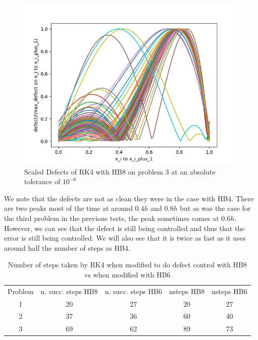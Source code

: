 \documentclass{article}
\begin{document}
\begin{figure}[H]
\centering
\includegraphics[width=0.7\linewidth]{./figures/rk4_with_hb8_p3_scaled_defects}
\caption{Scaled Defects of RK4 with HB8 on problem 3 at an absolute tolerance of $10^{-6}$}
\label{fig:rk4_with_hb8_p3_scaled_defects}
\end{figure}

We note that the defects are not as clean they were in the case with HB4. There are two peaks most of the time at around $0.4h$ and $0.8h$ but as was the case for the third problem in the previous tests, the peak sometimes comes at $0.6h$. However, we can see that the defect is still being controlled and thus that the error is still being controlled. We will also see that it is twice as fast as it uses around half the number of steps as HB4.

\begin{table}[h]
\caption {Number of steps taken by RK4 when modified to do defect control with HB8 vs when modified with HB6} \label{tab:rk4_with_hb8_nsteps}
\begin{center}
\begin{tabular}{ c c c c c } 
Problem & n. succ. steps HB8 & n. succ. steps HB6 & nsteps HB8 & nsteps HB6 \\ 
1       & 20                 &        27          & 20         & 27\\ 
2       & 37                 &        36          & 60         & 40\\
3       & 69                 &        62          & 89         & 73\\
\end{tabular}
\end{center}
\end{table}
\end{document}
